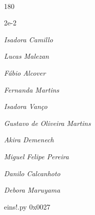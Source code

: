 \documentclass[12pt]{article}
\begin{document}
	\hfill	  	  


\pagebreak			

	\ 
	\vfill
	\begin{turn}{180}	
		\begin{minipage}{\textwidth}
		  	\ttfamily %
			\centering
			{\Huge 2e-2}
		  
			\hfill
		  
			

\textit{\small Isadora Camillo}

\textit{\small Lucas Malezan}

\textit{\small Fábio Alcover}

\textit{\small Fernanda Martins}

\textit{\small Isadora Vanço}

\textit{\small Gustavo de Oliveira Martins}

\textit{\small Akira Demenech}

\textit{\small Miguel Felipe Pereira}

\textit{\small Danilo Calcanhoto}

\textit{\small Debora Maruyama}

\bigskip

eins!.py
0x0027


		\end{minipage}	
	\end{turn}
	\vfill
	\

\pagebreak
\end{document}
